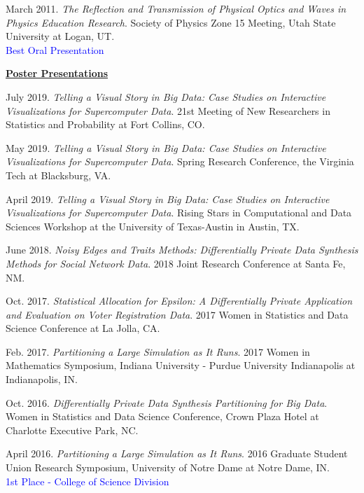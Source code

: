 \documentclass[11pt, letterpaper, roman]{moderncv} %
\begin{document}
\begin{etaremune}[topsep=0pt, itemsep=0.75pt, partopsep=0pt, parsep=0pt]
    \item March 2011. \textit{The Reflection and Transmission of Physical Optics and Waves in Physics Education Research}. Society of Physics Zone 15 Meeting, Utah State University at Logan, UT.\\
    \textcolor{blue}{Best Oral Presentation}
  
\vspace{8pt}
\hspace{-0.30in}\underline{\textbf{\large Poster Presentations}}\normalsize
    \item July 2019. \textit{Telling a Visual Story in Big Data: Case Studies on Interactive Visualizations for Supercomputer Data}. 21st Meeting of New Researchers in Statistics and Probability at Fort Collins, CO.
    
    \item May 2019. \textit{Telling a Visual Story in Big Data: Case Studies on Interactive Visualizations for Supercomputer Data}. Spring Research Conference, the Virginia Tech at Blacksburg, VA.
    
    \item April 2019. \textit{Telling a Visual Story in Big Data: Case Studies on Interactive Visualizations for Supercomputer Data}. Rising Stars in Computational and Data Sciences Workshop at the University of Texas-Austin in Austin, TX.
    
    \item June 2018. \textit{Noisy Edges and Traits Methods: Differentially Private Data Synthesis Methods for Social Network Data}. 2018 Joint Research Conference at Santa Fe, NM.
    
    \item Oct. 2017. \textit{Statistical Allocation for Epsilon: A Differentially Private Application and Evaluation on Voter Registration Data}. 2017 Women in Statistics and Data Science Conference at La Jolla, CA.
    
    \item Feb. 2017. \textit{Partitioning a Large Simulation as It Runs}. 2017 Women in Mathematics Symposium, Indiana University - Purdue University Indianapolis at Indianapolis, IN.
    
    \item Oct. 2016. \textit{Differentially Private Data Synthesis Partitioning for Big Data}. Women in Statistics and Data Science Conference, Crown Plaza Hotel at Charlotte Executive Park, NC. 
    
    \item April 2016. \textit{Partitioning a Large Simulation as It Runs}. 2016 Graduate Student Union Research Symposium, University of Notre Dame at Notre Dame, IN.\\
    \textcolor{blue}{1st Place - College of Science Division}
    

\end{etaremune}
\end{document}
